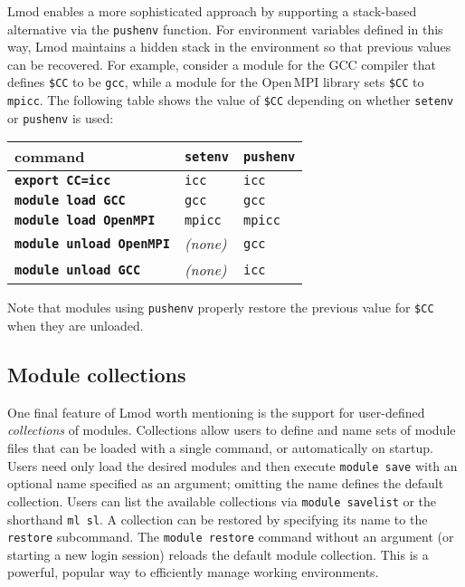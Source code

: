 Lmod enables a more sophisticated approach by supporting a stack-based
alternative via the \texttt{\small pushenv} function. For environment
variables defined in this way, Lmod maintains a hidden stack in the environment
so that previous values can be recovered.
For example, consider a module for the GCC compiler that
defines \texttt{\small \$CC} to be \texttt{\small gcc}, while a module for the
Open\,MPI library sets \texttt{\small \$CC} to
\texttt{\small mpicc}. The following table shows the value of \texttt{\small \$CC}
depending on whether \texttt{\small setenv} or \texttt{\small pushenv} is used:
\begin{center}
 \begin{tabular}{l|l|l}
 command                                 & \texttt{\small setenv} & \texttt{\small pushenv}\\
 \hline
 \textbf{\texttt{\small export CC=icc}}  & \texttt{\small icc}  & \texttt{\small icc} \\
 \textbf{\texttt{\small module load   GCC}}   & \texttt{\small gcc}    & \texttt{\small gcc}  \\
 \textbf{\texttt{\small module load   OpenMPI}} & \texttt{\small mpicc}  & \texttt{\small mpicc} \\
 \textbf{\texttt{\small module unload OpenMPI}} & \emph{(none)}   & \texttt{\small gcc}  \\
 \textbf{\texttt{\small module unload GCC}}   & \emph{(none)}   & \texttt{\small icc} \\
  \hline
    \end{tabular}
\end{center}
\noindent
Note that modules using \texttt{\small pushenv} properly restore the previous value
for \texttt{\small\$CC} when they are unloaded.


\subsection{Module collections}

One final feature of Lmod worth mentioning is the support for user-defined
\emph{collections} of modules. Collections allow users to define and name sets of
module files that can be loaded with a single command, or automatically on startup.
Users need only load the desired modules and then execute
\texttt{\small module save} with an optional name specified as an argument;
omitting the name defines the default collection. Users can list the available
collections via \texttt{\small module savelist} or the shorthand
\texttt{\small ml sl}. A collection can be restored by specifying its name to the
\texttt{\small restore} subcommand. The \texttt{\small module restore} command
without an argument (or starting a  new login session) reloads the default module
collection. This is a powerful, popular way to efficiently manage working
environments.


